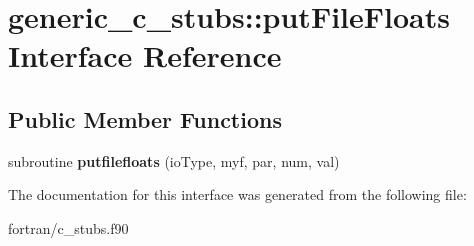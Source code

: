 \hypertarget{interfacegeneric__c__stubs_1_1put_file_floats}{}\section{generic\+\_\+c\+\_\+stubs\+:\+:put\+File\+Floats Interface Reference}
\label{interfacegeneric__c__stubs_1_1put_file_floats}
\subsection*{Public Member Functions}
\begin{DoxyCompactItemize}
\item 
\mbox{\label{interfacegeneric__c__stubs_1_1put_file_floats_afcbe3e98b5729ae3171b4b4d71e80781}} 
subroutine {\bfseries putfilefloats} (io\+Type, myf, par, num, val)
\end{DoxyCompactItemize}


The documentation for this interface was generated from the following file\+:\begin{DoxyCompactItemize}
\item 
fortran/c\+\_\+stubs.\+f90\end{DoxyCompactItemize}
